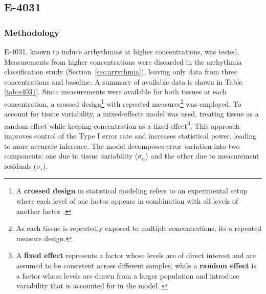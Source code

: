 \documentclass{report}
\begin{document}
    
    \subsection{E-4031} 
    \label{e4031-significance-analysis}
        \subsubsection{Methodology}
        \label{e4031-met}
            E-4031, known to induce arrhythmias at higher concentrations, was tested. Measurements from higher concentrations were discarded in the arrhythmia classification study (Section~\ref{sec:arrythmia}), leaving only data from three concentrations and baseline. A summary of available data is shown  in Table \ref{tab:e4031}. Since measurements were available for both tissues at each concentration, a crossed design\footnote{A \textbf{crossed design} in statistical modeling refers to an experimental setup where each level of one factor appears in combination with all levels of another factor \cite{nestedcrossed}.} with repeated measures\footnote{As each tissue is repeatedly exposed to multiple concentrations, its a repeated measure design.} was employed. To account for tissue variability, a mixed-effects model was used, treating tissue as a random effect while keeping concentration as a fixed effect\footnote{A \textbf{fixed effect} represents a factor whose levels are of direct interest and are assumed to be consistent across different samples, while a \textbf{random effect} is a factor whose levels are drawn from a larger population and introduce variability that is accounted for in the model. \cite{WikipediaMixedModel}}. This approach improves control of the Type I error rate and increases statistical power, leading to more accurate inference. The model decomposes error variation into two components: one due to tissue variability ($\sigma_\alpha$) and the other due to measurement residuals ($\sigma_\epsilon$).
            
\end{document}
